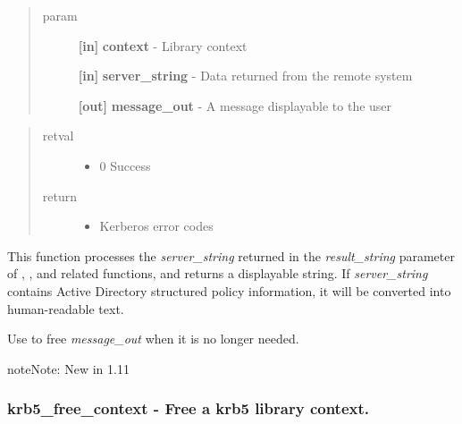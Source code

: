 \documentclass[letterpaper,10pt,english]{sphinxmanual}
\begin{document}
\begin{quote}\begin{description}
\item[{param}] \leavevmode
\textbf{{[}in{]}} \textbf{context} - Library context

\textbf{{[}in{]}} \textbf{server\_string} - Data returned from the remote system

\textbf{{[}out{]}} \textbf{message\_out} - A message displayable to the user

\end{description}\end{quote}
\begin{quote}\begin{description}
\item[{retval}] \leavevmode\begin{itemize}
\item {} 
0   Success

\end{itemize}

\item[{return}] \leavevmode\begin{itemize}
\item {} 
Kerberos error codes

\end{itemize}

\end{description}\end{quote}

This function processes the \emph{server\_string} returned in the \emph{result\_string} parameter of {\hyperref[appdev/refs/api/krb5_change_password:krb5_change_password]{}} , {\hyperref[appdev/refs/api/krb5_set_password:krb5_set_password]{}} , and related functions, and returns a displayable string. If \emph{server\_string} contains Active Directory structured policy information, it will be converted into human-readable text.

Use {\hyperref[appdev/refs/api/krb5_free_string:krb5_free_string]{}} to free \emph{message\_out} when it is no longer needed.

\begin{notice}{note}{Note:}
New in 1.11
\end{notice}


\subsubsection{krb5\_free\_context -  Free a krb5 library context.}
\label{appdev/refs/api/krb5_free_context:krb5-free-context-free-a-krb5-library-context}\label{appdev/refs/api/krb5_free_context::doc}
\end{document}
